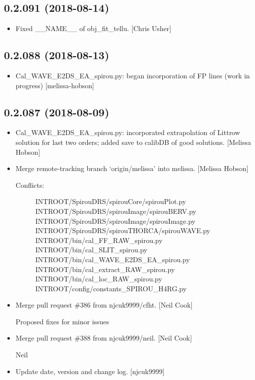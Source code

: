 \documentclass[a4paper,10pt,english]{report}
\begin{document}
\subsection{0.2.091 (2018-08-14)}
\label{\detokenize{misc/changelog:id371}}\begin{itemize}
\item {} 
Fixed \_\_NAME\_\_ of obj\_fit\_tellu. {[}Chris Usher{]}

\end{itemize}


\subsection{0.2.088 (2018-08-13)}
\label{\detokenize{misc/changelog:id372}}\begin{itemize}
\item {} 
Cal\_WAVE\_E2DS\_EA\_spirou.py: began incorporation of FP lines (work in
progress) {[}melissa-hobson{]}

\end{itemize}


\subsection{0.2.087 (2018-08-09)}
\label{\detokenize{misc/changelog:id373}}\begin{itemize}
\item {} 
Cal\_WAVE\_E2DS\_EA\_spirou.py: incorporated extrapolation of Littrow
solution for last two orders; added save to calibDB of good solutions.
{[}Melissa Hobson{]}

\item {} 
Merge remote-tracking branch ‘origin/melissa’ into melissa. {[}Melissa
Hobson{]}
\begin{description}
\item[{Conflicts:}] \leavevmode
INTROOT/SpirouDRS/spirouCore/spirouPlot.py
INTROOT/SpirouDRS/spirouImage/spirouBERV.py
INTROOT/SpirouDRS/spirouImage/spirouImage.py
INTROOT/SpirouDRS/spirouTHORCA/spirouWAVE.py
INTROOT/bin/cal\_FF\_RAW\_spirou.py
INTROOT/bin/cal\_SLIT\_spirou.py
INTROOT/bin/cal\_WAVE\_E2DS\_EA\_spirou.py
INTROOT/bin/cal\_extract\_RAW\_spirou.py
INTROOT/bin/cal\_loc\_RAW\_spirou.py
INTROOT/config/constants\_SPIROU\_H4RG.py

\end{description}

\item {} 
Merge pull request \#386 from njcuk9999/cfht. {[}Neil Cook{]}

Proposed fixes for minor issues

\item {} 
Merge pull request \#388 from njcuk9999/neil. {[}Neil Cook{]}

Neil

\item {} 
Update date, version and change log. {[}njcuk9999{]}

\end{itemize}
\end{document}
